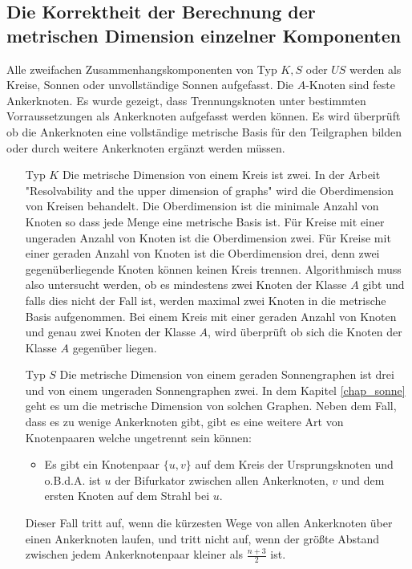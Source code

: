 \subsection{Die Korrektheit der Berechnung der metrischen Dimension einzelner Komponenten}
\label{korrkomp}
Alle zweifachen Zusammenhangskomponenten von Typ $K,S$ oder $US$ werden als Kreise, Sonnen oder unvollständige Sonnen aufgefasst. Die $A$-Knoten sind feste Ankerknoten. Es wurde gezeigt, dass Trennungsknoten unter bestimmten Vorraussetzungen als Ankerknoten aufgefasst werden können. Es wird überprüft ob die Ankerknoten eine vollständige metrische Basis für den Teilgraphen bilden oder durch weitere Ankerknoten ergänzt werden müssen.
\begin{itemize}
\item[Typ $K$]
Die metrische Dimension von einem Kreis ist zwei. In der Arbeit "Resolvability and the upper dimension of graphs" \cite{upper} wird die Oberdimension von Kreisen behandelt. Die Oberdimension ist die minimale Anzahl von Knoten so dass jede Menge eine metrische Basis ist.\newline
Für Kreise mit einer ungeraden Anzahl von Knoten ist die Oberdimension zwei.\newline
Für Kreise mit einer geraden Anzahl von Knoten ist die Oberdimension drei, denn zwei gegenüberliegende Knoten können keinen Kreis trennen. Algorithmisch muss also untersucht werden, ob es mindestens zwei Knoten der Klasse $A$ gibt und falls dies nicht der Fall ist, werden maximal zwei Knoten in die metrische Basis aufgenommen. Bei einem Kreis mit einer geraden Anzahl von Knoten und genau zwei Knoten der Klasse $A$, wird überprüft ob sich die Knoten der Klasse $A$ gegenüber liegen.
\item[Typ $S$]
Die metrische Dimension von einem geraden Sonnengraphen ist drei und von einem ungeraden Sonnengraphen zwei.
In dem Kapitel \ref{chap_sonne} geht es um die metrische Dimension von solchen Graphen. Neben dem Fall, dass es zu wenige Ankerknoten gibt, gibt es eine weitere Art von Knotenpaaren welche ungetrennt sein können:
\begin{itemize}
\item Es gibt ein Knotenpaar $\{u,v\}$ auf dem Kreis der Ursprungsknoten und o.B.d.A. ist $u$ der Bifurkator zwischen allen Ankerknoten, $v$ und dem ersten Knoten auf dem Strahl bei $u$.
\end{itemize}
Dieser Fall tritt auf, wenn die kürzesten Wege von allen Ankerknoten über einen Ankerknoten laufen, und tritt nicht auf, wenn der größte Abstand zwischen jedem Ankerknotenpaar kleiner als $\frac{n+3}{2}$ ist. 

\end{itemize}

